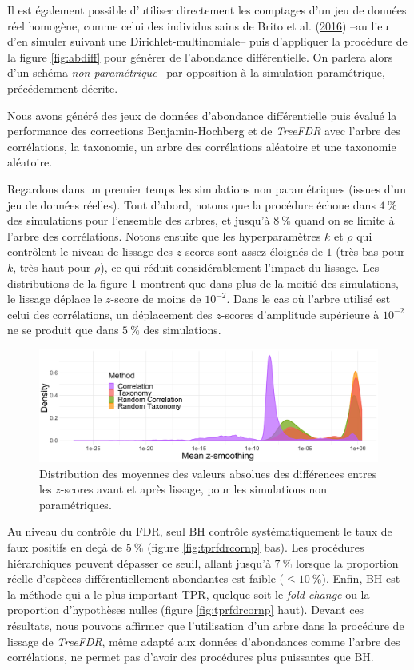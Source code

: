 \documentclass[12pt,a4paper]{reedthesis}
\theoremstyle{definition}
\theoremstyle{definition}
\theoremstyle{definition}
\theoremstyle{remark}
\begin{document}
Il est également possible d'utiliser directement les comptages d'un jeu de données réel homogène, comme celui des individus sains de Brito et al. (\protect\hyperlink{ref-brito2016mobile}{2016}) --au lieu d'en simuler suivant une Dirichlet-multinomiale-- puis d'appliquer la procédure de la figure \ref{fig:abdiff} pour générer de l'abondance différentielle. On parlera alors d'un schéma \emph{non-paramétrique} --par opposition à la simulation paramétrique, précédemment décrite.

Nous avons généré des jeux de données d'abondance différentielle puis évalué la performance des corrections Benjamin-Hochberg et de \emph{TreeFDR} avec l'arbre des corrélations, la taxonomie, un arbre des corrélations aléatoire et une taxonomie aléatoire.

Regardons dans un premier temps les simulations non paramétriques (issues d'un jeu de données réelles). Tout d'abord, notons que la procédure échoue dans \(4~\%\) des simulations pour l'ensemble des arbres, et jusqu'à \(8~\%\) quand on se limite à l'arbre des corrélations. Notons ensuite que les hyperparamètres \(k\) et \(\rho\) qui contrôlent le niveau de lissage des \(z\)-scores sont assez éloignés de \(1\) (très bas pour \(k\), très haut pour \(\rho\)), ce qui réduit considérablement l'impact du lissage. Les distributions de la figure \ref{fig:smoothing} montrent que dans plus de la moitié des simulations, le lissage déplace le \(z\)-score de moins de \(10^{-2}\). Dans le cas où l'arbre utilisé est celui des corrélations, un déplacement des \(z\)-scores d'amplitude supérieure à \(10^{-2}\) ne se produit que dans \(5~\%\) des simulations.


\begin{figure}

{\centering \includegraphics[width=0.9\linewidth]{img/smoothing} 

}

\caption{Distribution des moyennes des valeurs absolues des différences entres les \(z\)-scores avant et après lissage, pour les simulations non paramétriques.}\label{fig:smoothing}
\end{figure}
Au niveau du contrôle du FDR, seul BH contrôle systématiquement le taux de faux positifs en deçà de \(5~\%\) (figure \ref{fig:tprfdrcornp} bas). Les procédures hiérarchiques peuvent dépasser ce seuil, allant jusqu'à \(7~\%\) lorsque la proportion réelle d'espèces différentiellement abondantes est faible (\(\leq 10~\%\)). Enfin, BH est la méthode qui a le plus important TPR, quelque soit le \emph{fold-change} ou la proportion d'hypothèses nulles (figure \ref{fig:tprfdrcornp} haut). Devant ces résultats, nous pouvons affirmer que l'utilisation d'un arbre dans la procédure de lissage de \emph{TreeFDR}, même adapté aux données d'abondances comme l'arbre des corrélations, ne permet pas d'avoir des procédures plus puissantes que BH.
\end{document}
